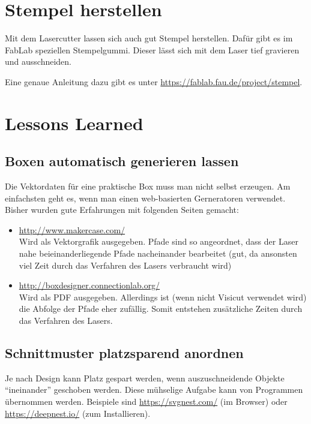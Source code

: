 \documentclass{\basedir/fablab-document}
\begin{document}
	\section{Stempel herstellen}
	\label{stempel}
	Mit dem Lasercutter lassen sich auch gut Stempel herstellen.
	Dafür gibt es im FabLab speziellen Stempelgummi.
	Dieser lässt sich mit dem Laser tief gravieren und ausschneiden.
	
	Eine genaue Anleitung dazu gibt es unter \url{https://fablab.fau.de/project/stempel}.
	
	\section{Lessons Learned}
	
	\subsection{Boxen automatisch generieren lassen}
	
	Die Vektordaten für eine praktische Box muss man nicht selbst erzeugen. Am einfachsten geht es, wenn man einen web-basierten Gerneratoren verwendet. \\
	
	Bisher wurden gute Erfahrungen mit folgenden Seiten gemacht:
	\begin{itemize}
		\item \url{http://www.makercase.com/} \\
		Wird als Vektorgrafik ausgegeben. Pfade sind so angeordnet, dass der Laser nahe beieinanderliegende Pfade nacheinander bearbeitet (gut, da ansonsten viel Zeit durch das Verfahren des Lasers verbraucht wird)
		\item \url{http://boxdesigner.connectionlab.org/} \\
		Wird als PDF ausgegeben. Allerdings ist (wenn nicht Visicut verwendet wird) die Abfolge der Pfade eher zufällig. Somit entstehen zusätzliche Zeiten durch das Verfahren des Lasers.
	\end{itemize}
	
	
	\subsection{Schnittmuster platzsparend anordnen}
	Je nach Design kann Platz gespart werden, wenn auszuschneidende Objekte
	\enquote{ineinander} geschoben werden.
	Diese mühselige Aufgabe kann von Programmen übernommen werden.
	Beispiele sind \url{https://svgnest.com/} (im Browser) oder \url{https://deepnest.io/} (zum Installieren).
	
\end{document}
